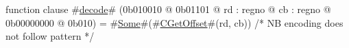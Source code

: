 function clause #\hyperref[zdecode]{decode}# (0b010010 @ 0b01101 @ rd : regno @ cb : regno @ 0b00000000 @ 0b010) = #\hyperref[zSome]{Some}#(#\hyperref[zCGetOffset]{CGetOffset}#(rd, cb)) /* NB encoding does not follow pattern */
